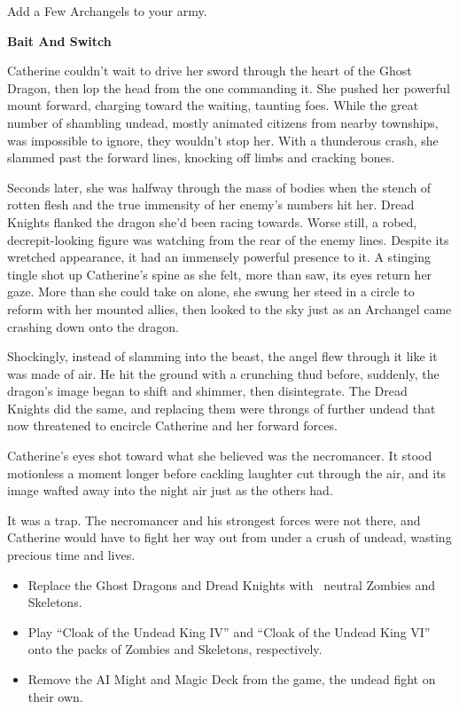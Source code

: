 \begin{multicols*}{2}
\textcolor{darkcandyapplered}{Add a Few Archangels to your army.}

\textbf{Bait And Switch}

Catherine couldn't wait to drive her sword through the heart of the Ghost Dragon, then lop the head from the one commanding it.
She pushed her powerful mount forward, charging toward the waiting, taunting foes.
While the great number of shambling undead, mostly animated citizens from nearby townships, was impossible to ignore, they wouldn't stop her.
With a thunderous crash, she slammed past the forward lines, knocking off limbs and cracking bones.

Seconds later, she was halfway through the mass of bodies when the stench of rotten flesh and the true immensity of her enemy's numbers hit her.
Dread Knights flanked the dragon she'd been racing towards.
Worse still, a robed, decrepit-looking figure was watching from the rear of the enemy lines.
Despite its wretched appearance, it had an immensely powerful presence to it.
A stinging tingle shot up Catherine's spine as she felt, more than saw, its eyes return her gaze.
More than she could take on alone, she swung her steed in a circle to reform with her mounted allies, then looked to the sky just as an Archangel came crashing down onto the dragon.

Shockingly, instead of slamming into the beast, the angel flew through it like it was made of air.
He hit the ground with a crunching thud before, suddenly, the dragon's image began to shift and shimmer, then disintegrate.
The Dread Knights did the same, and replacing them were throngs of further undead that now threatened to encircle Catherine and her forward forces.

Catherine's eyes shot toward what she believed was the necromancer.
It stood motionless a moment longer before cackling laughter cut through the air, and its image wafted away into the night air just as the others had.

It was a trap.
The necromancer and his strongest forces were not there, and Catherine would have to fight her way out from under a crush of undead, wasting precious time and lives.

\begin{itemize}
  \item \textcolor{darkcandyapplered}{Replace the Ghost Dragons and Dread Knights with \bronze\ neutral Zombies and Skeletons.}
  \item \textcolor{darkcandyapplered}{Play ``Cloak of the Undead King IV'' and ``Cloak of the Undead King VI'' onto the packs of Zombies and Skeletons, respectively.}
  \item \textcolor{darkcandyapplered}{Remove the AI Might and Magic Deck from the game, the undead fight on their own.}
\end{itemize}



\end{multicols*}
